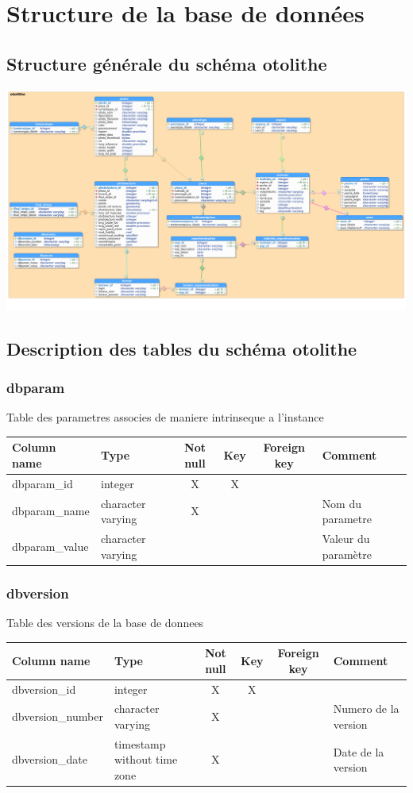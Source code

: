\chapter{Structure de la base de données}

\section{Structure générale du schéma otolithe}
\includegraphics[width=\linewidth
]{otolithe.png}

\section{Description des tables du schéma otolithe}
\subsection{dbparam}
Table des parametres associes de maniere intrinseque a l'instance

\begin{tabular}{|l| p{2cm}|c|c|c| p{3cm}|}
\hline
Column name & Type & Not null & Key & Foreign key & Comment \\
\hline
dbparam\_id & integer & X & X & & \\
\hline
dbparam\_name & character varying & X & & & Nom du parametre\\
\hline
dbparam\_value & character varying & & & & Valeur du paramètre\\
\hline
\end{tabular}
\subsection{dbversion}
Table des versions de la base de donnees

\begin{tabular}{|l| p{2cm}|c|c|c| p{3cm}|}
\hline
Column name & Type & Not null & Key & Foreign key & Comment \\
\hline
dbversion\_id & integer & X & X & & \\
\hline
dbversion\_number & character varying & X & & & Numero de la version\\
\hline
dbversion\_date & timestamp without time zone & X & & & Date de la version\\
\hline
\end{tabular}
